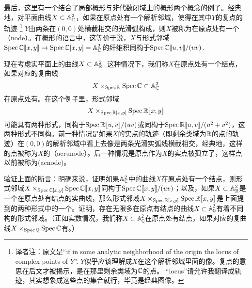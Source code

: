 最后，这里有一个结合了局部概形与非代数闭域上的概形两个概念的例子。经典地，对平面曲线$X\subset \mathbb{A}_{\mathbb{C}}^2$，如果在原点处有一个解析邻域，使得在其中$Y$的复点的轨迹
\footnote{译者注：原文是``if in some analytic neighborhood of the origin the locus of complex points of $Y$''. $Y$似乎应该理解成$X$在这个解析邻域里面的像。复点的意思在后文才被揭示，是在那里剩余类域为$\mathbb{C}$的点。 ``locus''请允许我翻译成轨迹，其实想象成这些点的集合就行，毕竟是经典图像。}
$Y$由两条在$(0,0)$处横截相交的光滑弧构成，则$X$被称为在原点处有一个（node）。在概形的语言中，这等价于说，$X$与形式邻域$\operatorname{Spec} \mathbb{C}[\![x,y]\!]\to \operatorname{Spec} \mathbb{C}[x,y]=\mathbb{A}_{\mathbb{C}}^2$的纤维积同构于$\operatorname{Spec} \mathbb{C}[\![u,v]\!]/(uv)$.

现在考虑实平面上的曲线$X\subset \mathbb{A}_{\mathbb{R}}^2$. 这种情况下，我们称$X$在原点处有一个结点，如果对应的复曲线
\[
	X\times_{\operatorname{Spec} \mathbb{R}}\operatorname{Spec} \mathbb{C} \subset \mathbb{A}_{\mathbb{C}}^2
\]
在原点处有。在这个例子里，形式邻域
\[
	X\times_{\operatorname{Spec} \mathbb{R}[x,y]}\operatorname{Spec} \mathbb{R}[\![x,y]\!]
\]
可能具有两种形式，同构于$\operatorname{Spec} \mathbb{R}[\![u,v]\!]/(uv)$或同构于$\operatorname{Spec} \mathbb{R}[\![u,v]\!]/(u^2+v^2)$，这两种形式不同构。前一种情况是如果$X$的实点的轨迹（即剩余类域为$\mathbb{R}$的点的轨迹）在$(0,0)$的解析邻域中看上去像是两条光滑实弧线横截相交，经典地，这样的点被称为$X$的（acrunode）。后一种情况是原点作为$X$的实点被孤立了，这样点以前被称为(acnode)。

\begin{exe}
	验证上面的断言：明确来说，证明如果$\mathbb{A}_{\mathbb{C}}^2$中的曲线$X$在原点处有一个结点，则形式邻域$X\times_{\operatorname{Spec} \mathbb{C}[x,y]}\operatorname{Spec} \mathbb{C}[\![x,y]\!]$同构于$\operatorname{Spec}\mathbb{C}[\![x,y]\!]/(uv)$；以及，如果$X\subset \mathbb{A}_{\mathbb{R}}^2$是一个在原点处有结点的实曲线，那么形式邻域$X\times_{\operatorname{Spec} \mathbb{R}[x,y]}\operatorname{Spec} \mathbb{R}[\![x,y]\!]$是上面提到的两种形式中的一个。证明，存在无限多在原点有结点的曲线$X\subset \mathbb{A}_{\mathbb{Q}}^2$有着不同构的形式邻域。（正如实数情况，我们称$X\subset \mathbb{A}^2_\mathbb{Q}$在原点处有结点，如果对应的复曲线$X\times_{\operatorname{Spec} \mathbb{Q}} \operatorname{Spec} \mathbb{C}$有。）
\end{exe}